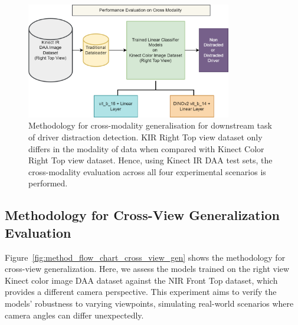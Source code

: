 \begin{figure}[h]
\begin{center}
\includegraphics[width=0.8\textwidth]{Images_Thesis/methodology_images/methodology_cross_modality_generalisation.png}
\end{center}
\caption[Methodology for cross-modality generalisation.]{Methodology for cross-modality generalisation for downstream task of driver distraction detection. KIR Right Top view dataset only differs in the modality of data when compared with Kinect Color Right Top view dataset. Hence, using Kinect IR DAA test sets, the cross-modality evaluation across all four experimental scenarios is performed.}
\label{fig:method_flow_chart_cross_modality_gen}
\end{figure}

\subsection{Methodology for Cross-View Generalization Evaluation}
\label{section:Methodology for Cross-View Generalization Evaluation}
Figure~\ref{fig:method_flow_chart_cross_view_gen} shows the methodology for cross-view generalization. Here, we assess the models trained on the right view Kinect color image DAA dataset against the NIR Front Top dataset, which provides a different camera perspective. This experiment aims to verify the models' robustness to varying viewpoints, simulating real-world scenarios where camera angles can differ unexpectedly.

